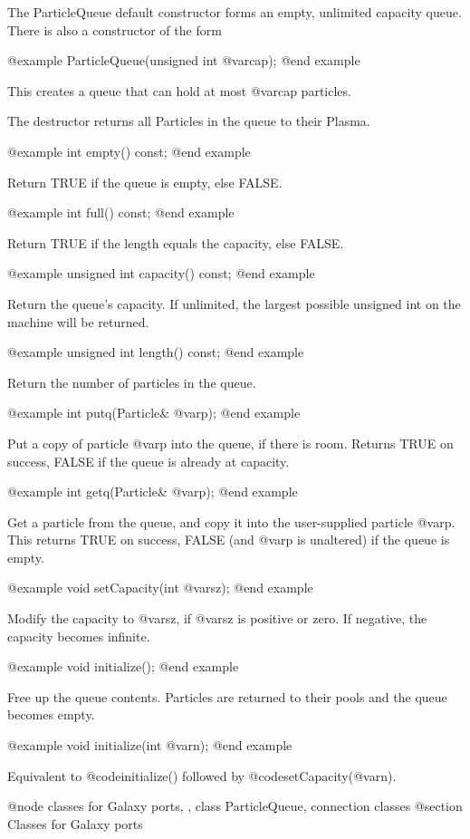 The ParticleQueue default constructor forms an empty, unlimited capacity
queue.  There is also a constructor of the form

@example
ParticleQueue(unsigned int @var{cap});
@end example

This creates a queue that can hold at most @var{cap} particles.

The destructor returns all Particles in the queue to their Plasma.

@example
int empty() const;
@end example

Return TRUE if the queue is empty, else FALSE.

@example
int full() const;
@end example

Return TRUE if the length equals the capacity, else FALSE.

@example
unsigned int capacity() const;
@end example

Return the queue's capacity.  If unlimited, the largest possible
unsigned int on the machine will be returned.

@example
unsigned int length() const;
@end example

Return the number of particles in the queue.

@example
int putq(Particle& @var{p});
@end example

Put a copy of particle @var{p} into the queue, if there is room.
Returns TRUE on success, FALSE if the queue is already at capacity.

@example
int getq(Particle& @var{p});
@end example

Get a particle from the queue, and copy it into the user-supplied
particle @var{p}.  This returns TRUE on success, FALSE (and @var{p}
is unaltered) if the queue is empty.

@example
void setCapacity(int @var{sz});
@end example

Modify the capacity to @var{sz}, if @var{sz} is positive or zero.  If
negative, the capacity becomes infinite.

@example
void initialize();
@end example

Free up the queue contents.  Particles are returned to their pools and
the queue becomes empty.

@example
void initialize(int @var{n});
@end example

Equivalent to @code{initialize()} followed by @code{setCapacity(@var{n})}.

@node classes for Galaxy ports,  , class ParticleQueue, connection classes
@section Classes for Galaxy ports

